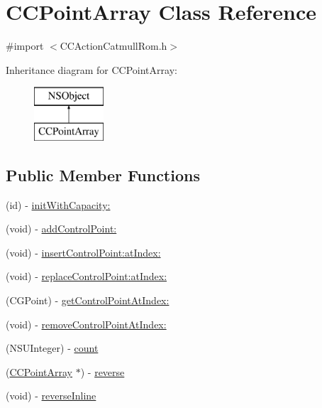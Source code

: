 \hypertarget{interface_c_c_point_array}{\section{C\-C\-Point\-Array Class Reference}
\label{interface_c_c_point_array}
}


{\ttfamily \#import $<$C\-C\-Action\-Catmull\-Rom.\-h$>$}

Inheritance diagram for C\-C\-Point\-Array\-:\begin{figure}[H]
\begin{center}
\leavevmode
\includegraphics[height=2.000000cm]{interface_c_c_point_array}
\end{center}
\end{figure}
\subsection*{Public Member Functions}
\begin{DoxyCompactItemize}
\item 
(id) -\/ \hyperlink{interface_c_c_point_array_a8a6617ead247c1d873748cc3f8aacb24}{init\-With\-Capacity\-:}
\item 
(void) -\/ \hyperlink{interface_c_c_point_array_a9d48d1fab42f48e15e5395fc1333f0f9}{add\-Control\-Point\-:}
\item 
(void) -\/ \hyperlink{interface_c_c_point_array_ac8e14573a97135ef9d98e9cc3aa08239}{insert\-Control\-Point\-:at\-Index\-:}
\item 
(void) -\/ \hyperlink{interface_c_c_point_array_af96d6e851d9564b418200a33e4e85a2c}{replace\-Control\-Point\-:at\-Index\-:}
\item 
(C\-G\-Point) -\/ \hyperlink{interface_c_c_point_array_ae12f98d5081124b694bca3ea62ba648a}{get\-Control\-Point\-At\-Index\-:}
\item 
(void) -\/ \hyperlink{interface_c_c_point_array_ab048541956b630110ee068d6d0aa2b48}{remove\-Control\-Point\-At\-Index\-:}
\item 
(N\-S\-U\-Integer) -\/ \hyperlink{interface_c_c_point_array_a1111f5e5f274ef1295c44c1bdec7bf65}{count}
\item 
(\hyperlink{interface_c_c_point_array}{C\-C\-Point\-Array} $\ast$) -\/ \hyperlink{interface_c_c_point_array_af4b6c9cb598d08690aafc7054b2b04f3}{reverse}
\item 
(void) -\/ \hyperlink{interface_c_c_point_array_a86abfa5bdcf828688b1bf4c4a8c089dc}{reverse\-Inline}
\end{DoxyCompactItemize}
